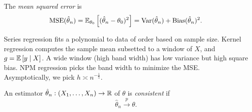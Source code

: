 \begin{definition}
	The \emph{mean squared error} is
	\[
		\operatorname{MSE}(\hat\theta_n)=\mathbb{E}_{\theta_0}\left[(\hat\theta_n-\theta_0)^2\right]
		=
		\operatorname{Var}(\hat\theta_n)+\text{Bias}(\hat\theta_n)^2.
	\]
\end{definition}

Series regression fits a polynomial to data of order based on sample size. Kernel regression computes the sample mean subsetted to a window of $X$, and $g = \mathbb{E}\left[y \mid X\right]$.
A wide window (high band width) has low variance but high square bias. NPM regression picks the band width to minimize the MSE. Asymptotically, we pick $h \asymp n^{-\frac{1}{5}}$.

\begin{definition}
	An estimator $\hat\theta_n:(X_1,\ldots,X_n)\to \mathbb{R}$ of $\theta$ is \emph{consistent} if
	\[
		\hat\theta_n \xrightarrow{p} \theta.
	\]
\end{definition}

